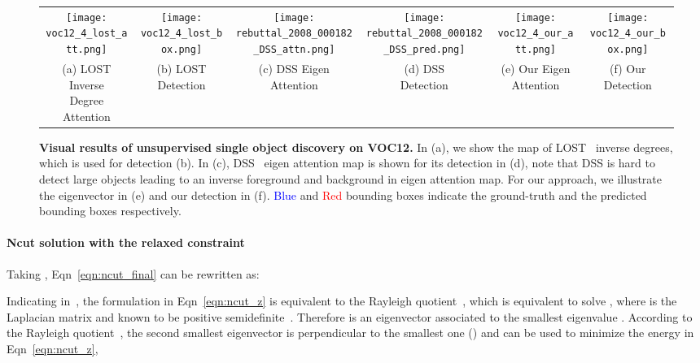 \documentclass[twocolumn]{article}
\begin{document}
\begin{figure*}[!t]
\begin{tabular}{c@{\hskip 1.3pt}c@{\hskip 1.3pt}c@{\hskip 1.3pt}c@{\hskip 1.3pt}c@{\hskip 1.3pt}c}
        \texttt{[image: voc12\_4\_lost\_att.png]} &
		\texttt{[image: voc12\_4\_lost\_box.png]} &
        \texttt{[image: rebuttal\_2008\_000182\_DSS\_attn.png]} &
		\texttt{[image: rebuttal\_2008\_000182\_DSS\_pred.png]} &
		\texttt{[image: voc12\_4\_our\_att.png]} &
		\texttt{[image: voc12\_4\_our\_box.png]} \\
		\makecell{(a) LOST Inverse \\ Degree Attention}  & \makecell{(b) LOST \\ Detection} & \makecell{(c) DSS Eigen\\ Attention} & \makecell{(d) DSS \\ Detection} & \makecell{(e) Our Eigen \\Attention} & \makecell{(f) Our \\Detection} \\
\end{tabular}
\caption{\textbf{Visual results of unsupervised single object discovery on VOC12.} In (a), we show the map of LOST~\cite{simeoni2021localizing} inverse degrees, which is used for detection (b). In (c), DSS~\cite{melaskyriazi2022deep} eigen attention map is shown for its detection in (d), note that DSS is hard to detect large objects leading to an inverse foreground and background in eigen attention map. For our approach, we illustrate the eigenvector in (e) and our detection in (f). \textcolor{blue}{Blue} and \textcolor{red}{Red} bounding boxes indicate the ground-truth and the predicted bounding boxes respectively. }
\label{fig:visual_res}
\end{figure*}



		
		
		

\paragraph*{Ncut solution with the relaxed constraint}
Taking , Eqn~\ref{eqn:ncut_final} can be rewritten as: 

Indicating in~\cite{shi2000normalized}, the formulation in Eqn~\ref{eqn:ncut_z} is equivalent to the Rayleigh quotient~\cite{van1996matrix}, which is equivalent to solve , where  is the Laplacian matrix and known to be positive semidefinite~\cite{pothen1990partitioning}. Therefore  is an eigenvector associated to the smallest eigenvalue . According to the Rayleigh quotient~\cite{van1996matrix}, the second smallest  eigenvector  is perpendicular to the smallest one () and can be used to minimize the energy in Eqn~\ref{eqn:ncut_z},
\end{document}
